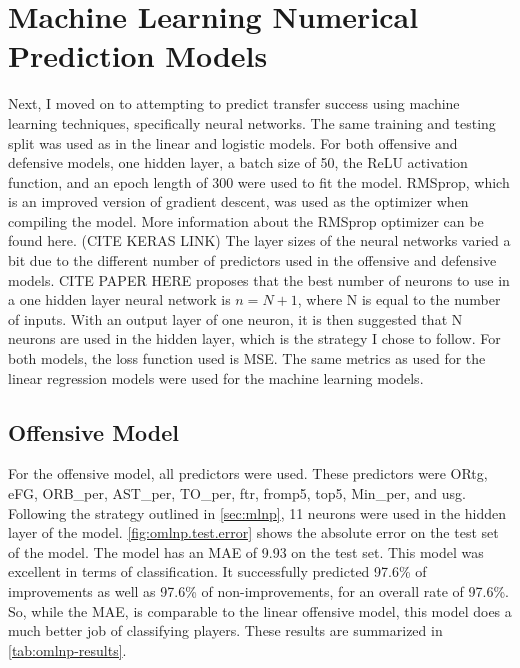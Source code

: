 \documentclass[12pt]{article}
\begin{document}
\section{Machine Learning Numerical Prediction Models}
\label{sec:mlnp}
Next, I moved on to attempting to predict transfer success using machine learning techniques, specifically neural networks. The same training and testing split was used as in the linear and logistic models. For both offensive and defensive models, one hidden layer, a batch size of 50, the ReLU activation function, and an epoch length of 300 were used to fit the model. RMSprop, which is an improved version of gradient descent, was used as the optimizer when compiling the model. More information about the RMSprop optimizer can be found here. (CITE KERAS LINK) The layer sizes of the neural networks varied a bit due to the different number of predictors used in the offensive and defensive models. CITE PAPER HERE proposes that the best number of neurons to use in a one hidden layer neural network is \(n = N + 1\), where N is equal to the number of inputs. With an output layer of one neuron, it is then suggested that N neurons are used in the hidden layer, which is the strategy I chose to follow. For both models, the loss function used is MSE. The same metrics as used for the linear regression models were used for the machine learning models.

\subsection{Offensive Model}
\label{subsec:omlnp}
For the offensive model, all predictors were used. These predictors were ORtg, eFG, ORB\_per, AST\_per, TO\_per, ftr, fromp5, top5, Min\_per, and usg. Following the strategy outlined in \autoref{sec:mlnp}, 11 neurons were used in the hidden layer of the model. \autoref{fig:omlnp.test.error} shows the absolute error on the test set of the model. The model has an MAE of 9.93 on the test set. This model was excellent in terms of classification. It successfully predicted 97.6\% of improvements as well as 97.6\% of non-improvements, for an overall rate of 97.6\%. So, while the MAE, is comparable to the linear offensive model, this model does a much better job of classifying players. These results are summarized in \autoref{tab:omlnp-results}.
\end{document}

